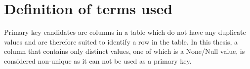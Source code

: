 \section{Definition of terms used}\label{sec:definition_terms}
Primary key candidates are columns in a table which do not have any duplicate values and are therefore suited to identify a row in the table. In this thesis, a column that contains only distinct values, one of which is a None/Null value, is considered non-unique as it can not be used as a primary key.

